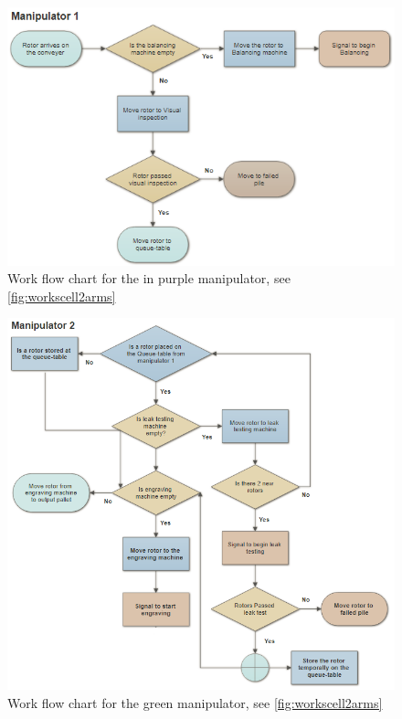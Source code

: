 
\begin{figure}[H]
    \centering
    \includegraphics[width=\textwidth]{Design/mani1.PNG} 
    \caption{Work flow chart for the in purple manipulator, see \ref{fig:workscell2arms} }
    \label{fig:flow21}
\end{figure}
\begin{figure}[H]
    \centering
    \includegraphics[width=\textwidth]{Design/mani2.PNG}
    \caption{Work flow chart for the green manipulator, see \ref{fig:workscell2arms}}
    \label{fig:flow22} 
\end{figure}